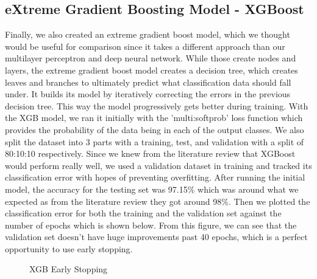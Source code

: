 \documentclass[11pt]{article}
\begin{document}
    \subsection{eXtreme Gradient Boosting Model - XGBoost}
    Finally, we also created an extreme gradient boost model, which we thought would be useful for comparison since it takes a different approach than our multilayer perceptron and deep neural network. While those create nodes and layers, the extreme gradient boost model creates a decision tree, which creates leaves and branches to ultimately predict what classification data should fall under. It builds its model by iteratively correcting the errors in the previous decision tree. This way the model progressively gets better during training. With the XGB model, we ran it initially with the 'multi:softprob' loss function which provides the probability of the data being in each of the output classes. We also split the dataset into 3 parts with a training, test, and validation with a split of 80:10:10 respectively. Since we knew from the literature review that XGBoost would perform really well, we used a validation dataset in training and tracked its classification error with hopes of preventing overfitting. After running the initial model, the accuracy for the testing set was 97.15\% which was around what we expected as from the literature review they got around 98\%. Then we plotted the classification error for both the training and the validation set against the number of epochs which is shown below. From this figure, we can see that the validation set doesn't have huge improvements past 40 epochs, which is a perfect opportunity to use early stopping. 
    \begin{figure}[h]
      \centering
      \hfill
      \caption{XGB Early Stopping}
    \end{figure}
    
\end{document}
